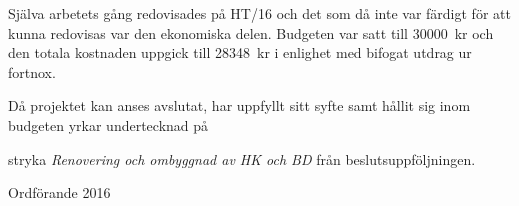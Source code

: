 \documentclass[../_main/handlingar.tex]{subfiles}
\begin{document}

Själva arbetets gång redovisades på HT/16 och det som då inte var färdigt för att kunna redovisas var den ekonomiska delen. Budgeten var satt till \SI{30000}{kr} och den totala kostnaden uppgick till \SI{28348}{kr} i enlighet med bifogat utdrag ur fortnox.

Då projektet kan anses avslutat, har uppfyllt sitt syfte samt hållit sig inom budgeten yrkar undertecknad på

\begin{attsatser}
    \att stryka \emph{Renovering och ombyggnad av HK och BD} från beslutsuppföljningen.
\end{attsatser}

\begin{signatures}{1}
    \mvh
    \signature{Fredrik Peterson}{Ordförande 2016}
\end{signatures}
\end{document}
